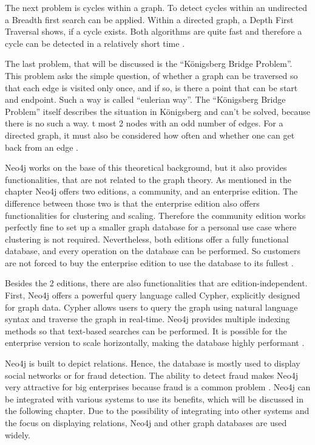 The next problem is cycles within a graph. To detect cycles within an undirected a Breadth first search can be applied. Within a directed graph, a Depth First Traversal shows, if a cycle exists. Both algorithms are quite fast and therefore a cycle can be detected in a relatively short time \parencite{graphCircle, cycle_directed}.

The last problem, that will be discussed is the \enquote{Königsberg Bridge Problem}. This problem asks the simple question, of whether a graph can be traversed so that each edge is visited only once, and if so, is there a point that can be start and endpoint. Such a way is called \enquote{eulerian way}. The
\enquote{Königsberg Bridge Problem}  itself describes the situation in Königsberg and can't be solved, because there is no such a way. t most 2 nodes with an odd number of edges. For a directed graph, it must also be considered how often and whether one can get back from an edge \parencite{koenigsberger}.

Neo4j works on the base of this theoretical background, but it also provides functionalities, that are not related to the graph theory. As mentioned in the chapter  Neo4j offers two editions, a community, and an enterprise edition. The difference between those two is that the enterprise edition also offers functionalities for clustering and scaling. Therefore the community edition works perfectly fine to set up a smaller
graph database for a personal use case where clustering is not required. Nevertheless, both editions offer a fully functional database, and every operation on the database can be performed. So customers are not forced to buy the enterprise edition to use the database to its fullest \parencite{Neo4jfeatures}.

Besides the 2 editions, there are also functionalities that are edition-independent. First, Neo4j offers a powerful query language called Cypher, explicitly designed for graph data. Cypher allows users to query the graph using natural language syntax and traverse the graph in real-time. Neo4j provides multiple indexing methods so that text-based searches can be performed.
It is possible for the enterprise version to scale horizontally, making the database highly performant \parencite{Neo4jfeatures}.

Neo4j is built to depict relations. Hence, the database is mostly used to display social networks or for fraud detection. The ability to detect fraud makes Neo4j very attractive for big enterprises because fraud is a common problem \parencite{Neo4jfeatures}. Neo4j can be integrated with various systems to use its benefits, which will be discussed in the following chapter. Due to the possibility of integrating into other systems and the focus on displaying relations, Neo4j and other graph databases 
are used widely.

